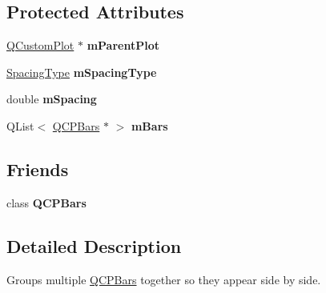 \subsection*{Protected Attributes}
\begin{DoxyCompactItemize}
\item 
\mbox{\label{class_q_c_p_bars_group_a973d408cfbf88db95115aec71877f9e7}} 
\mbox{\hyperlink{class_q_custom_plot}{Q\+Custom\+Plot}} $\ast$ {\bfseries m\+Parent\+Plot}
\item 
\mbox{\label{class_q_c_p_bars_group_a6794ee1a9c81864d627bff6a4b2d64ec}} 
\mbox{\hyperlink{class_q_c_p_bars_group_a4c0521120a97e60bbca37677a37075b6}{Spacing\+Type}} {\bfseries m\+Spacing\+Type}
\item 
\mbox{\label{class_q_c_p_bars_group_a56471d7f548ca6141b7a5bf9629f7ece}} 
double {\bfseries m\+Spacing}
\item 
\mbox{\label{class_q_c_p_bars_group_affdb1e9233c277ff5a4c0a1121cf1fc0}} 
Q\+List$<$ \mbox{\hyperlink{class_q_c_p_bars}{Q\+C\+P\+Bars}} $\ast$ $>$ {\bfseries m\+Bars}
\end{DoxyCompactItemize}
\subsection*{Friends}
\begin{DoxyCompactItemize}
\item 
\mbox{\label{class_q_c_p_bars_group_a721b87c7cdb8e83a90d77fc8a22e7195}} 
class {\bfseries Q\+C\+P\+Bars}
\end{DoxyCompactItemize}


\subsection{Detailed Description}
Groups multiple \mbox{\hyperlink{class_q_c_p_bars}{Q\+C\+P\+Bars}} together so they appear side by side. 



